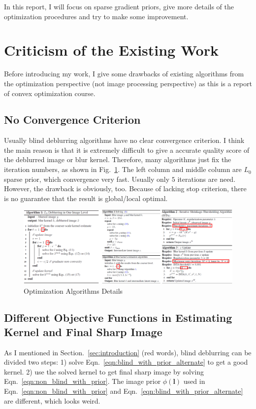\documentclass[journal, onecolumn, 10pt]{IEEEtran}
\begin{document}
In this report, I will focus on sparse gradient priors, give more details of the optimization procedures and try to make some improvement.  

\section{Criticism of the Existing Work}
Before introducing my work, I give some drawbacks of existing algorithms from the optimization perspective (not image processing perspective) as this is a report of convex optimization course.

\subsection{No Convergence Criterion}
Usually blind deblurring algorithms have no clear convergence criterion. I think the main reason is that it is extremely difficult to give a accurate quality score of the deblurred image or blur kernel. Therefore, many algorithms just fix the iteration numbers, as shown in Fig.~\ref{fig:optimization_details}. The left column and middle column are $L_0$ sparse prior, which convergence very fast. Usually only $5$ iterations are need. However, the drawback is obviously, too. Because of lacking stop criterion, there is no guarantee that the result is global/local optimal.
\begin{figure}[h!]
\centering
\includegraphics[width = 1\textwidth]{pic/algorithms.png}
\hspace{\fill}
\caption{Optimization Algorithms Details}
\label{fig:optimization_details}
\end{figure}

\subsection{Different Objective Functions in Estimating Kernel and Final Sharp Image}
As I mentioned in Section.~\ref{sec:introduction} (red words), blind deblurring can be divided two steps: 1) solve Eqn.~\ref{eqn:blind_with_prior_alternate} to get a good kernel. 2) use the solved kernel to get final sharp image by solving Eqn.~\ref{eqn:non_blind_with_prior}. The image prior $\phi(\mathbf{l})$ used in Eqn.~\ref{eqn:non_blind_with_prior} and Eqn.~\ref{eqn:blind_with_prior_alternate} are different, which looks weird. 
\end{document}

